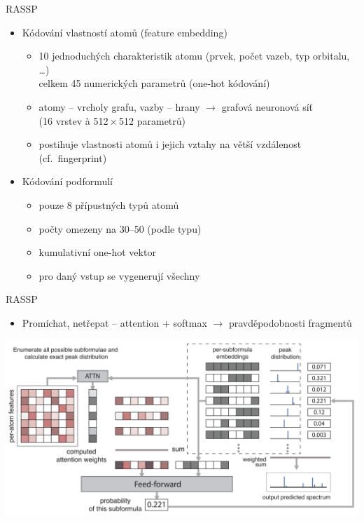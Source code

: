 \documentclass[aspectratio=169]{beamer}
\begin{document}
\begin{frame}
{RASSP}
\begin{itemize}
\item Kódování vlastností atomů (feature embedding)
\begin{itemize}
\item 10 jednoduchých charakteristik atomu (prvek, počet vazeb, typ orbitalu, \dots) \\
celkem 45 numerických parametrů (one-hot kódování)
\item atomy -- vrcholy grafu, vazby -- hrany $\rightarrow$ grafová neuronová síť\\
(16 vrstev \`a 512${}\times{}$512 parametrů)
\item postihuje vlastnosti atomů i jejich vztahy na větší vzdálenost (cf.~fingerprint)
\end{itemize}
\pause
\item Kódování podformulí
\begin{itemize}
\item pouze 8 přípustných typů atomů
\item počty omezeny na 30--50 (podle typu)
\item kumulativní one-hot vektor
\item pro daný vstup se vygenerují všechny
\end{itemize}
\end{itemize}
\end{frame}

\begin{frame}
{RASSP}
\begin{itemize}
\item Promíchat, netřepat -- attention + softmax $\rightarrow$ pravděpodobnosti fragmentů
\end{itemize}
\includegraphics[width=.9\hsize]{rassp-arch}
\end{frame}
\end{document}

